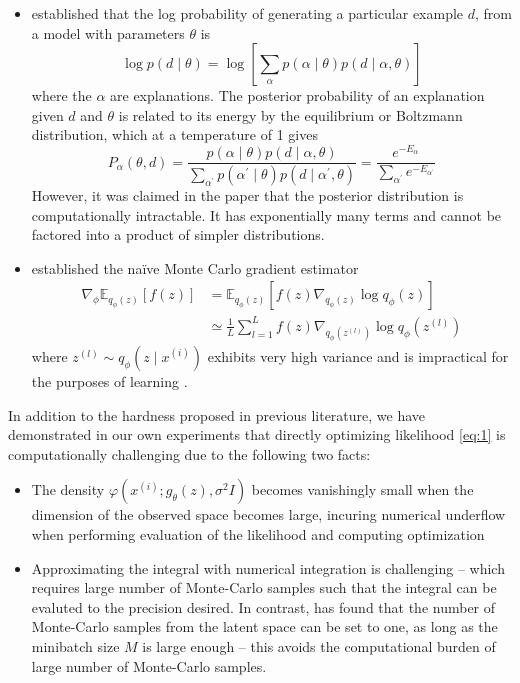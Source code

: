 \begin{itemize}
\item \cite{helmholtz} established that the log probability of generating a particular example $d$, from a model with parameters $\theta$ is
$$
\log p(d \mid \theta)=\log \left[\sum_\alpha p(\alpha \mid \theta) p(d \mid \alpha, \theta)\right]
$$
where the $\alpha$ are explanations. The posterior probability of an explanation given $d$ and $\theta$ is related to its energy by the equilibrium or Boltzmann distribution, which at a temperature of 1 gives
$$
P_\alpha(\theta, d)=\frac{p(\alpha \mid \theta) p(d \mid \alpha, \theta)}{\sum_{\alpha^{\prime}} p\left(\alpha^{\prime} \mid \theta\right) p\left(d \mid \alpha^{\prime}, \theta\right)}=\frac{e^{-E_\alpha}}{\sum_{\alpha^{\prime}} e^{-E_{\alpha^{\prime}}}}
$$
However, it was claimed in the paper that the posterior distribution is computationally intractable. It has exponentially many terms and cannot be factored into a product of simpler distributions.

\item \cite{vae} established the naïve Monte Carlo gradient estimator
\begin{equation*}
\begin{aligned}
\nabla_\phi \mathbb{E}_{q_\phi(z)}[f(z)]&=\mathbb{E}_{q_\phi(z)}\left[f(z) \nabla_{q_\phi(z)} \log q_\phi(z)\right]\\ &\simeq \frac{1}{L} \sum_{l=1}^L f(z) \nabla_{q_\phi\left(z^{(l)}\right)} \log q_\phi\left(z^{(l)}\right)
\end{aligned}
\end{equation*}
where $z^{(l)} \sim q_\phi\left(z \mid x^{(i)}\right)$ exhibits very high variance and is impractical for the purposes of learning \cite{BJP12}.
\end{itemize}

In addition to the hardness proposed in previous literature, we have demonstrated in our own experiments that directly optimizing likelihood \ref{eq:1} is computationally challenging due to the following two facts:
\begin{itemize}
  \item The density $\varphi\left(x^{(i)} ; g_{\theta}(z), \sigma^{2} I\right)$ becomes vanishingly small when the dimension of the observed space becomes large, incuring numerical underflow when performing evaluation of the likelihood and computing optimization
  \item Approximating the integral with numerical integration is challenging -- which requires large number of Monte-Carlo samples such that the integral can be evaluted to the precision desired. In contrast, \cite{vae} has found that the number of Monte-Carlo samples from the latent space can be set to one, as long as the minibatch size $M$ is large enough -- this avoids the computational burden of large number of Monte-Carlo samples.
\end{itemize}
